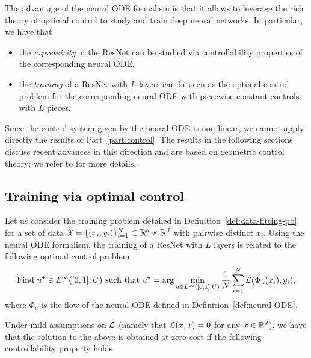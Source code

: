 The advantage of the neural ODE formalism is that it allows to leverage the rich theory of optimal control to study and train deep neural networks.
In particular, we have that 
\begin{itemize}
    \item the \emph{expressivity} of the ResNet can be studied via controllability properties of the corresponding neural ODE,
    \item the \emph{training} of a ResNet with $L$ layers can be seen as the optimal control problem for the corresponding neural ODE with piecewise constant controls with $L$ pieces.
\end{itemize}

Since the control system given by the neural ODE is non-linear, we cannot apply directly the results of Part~\ref{part:control}.
The results in the following sections discuss recent advances in this direction and are based on geometric control theory; we refer to \cite{agrachevControl2022,tabuadaUniversal2023} for more details.

\subsection{Training via optimal control}

Let us consider the training problem detailed in Definition~\ref{def:data-fitting-pb}, for a set of data $\mathfrak{X}=\{(x_i,y_i)\}_{i=1}^N\subset \mathbb{R}^d\times \mathbb{R}^d$ with pairwise distinct $x_i$.
Using the neural ODE formalism, the training of a ResNet with $L$ layers is related to the following optimal control problem 
\begin{equation}
    \label{eq:neural-ODE-training}
    \text{Find } u^\star\in L^\infty([0,1];U) \text{ such that }
    u^\star = \arg\min_{u\in L^\infty([0,1];U)} \frac1N \sum_{i=1}^N \mathcal{L}(\Phi_u(x_i),y_i),
\end{equation}
where $\Phi_u$ is the flow of the neural ODE defined in Definition~\ref{def:neural-ODE}.

Under mild assumptions on $\mathcal{L}$ (namely that $\mathcal{L}(x,x)=0$ for any $x\in \mathbb{R}^d$), we have that the solution to the above is obtained at zero cost if the following controllability property holds.


